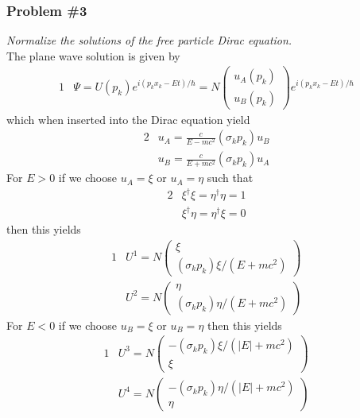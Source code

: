 \documentclass[]{article}
\numberwithin{equation}{subsection}
\begin{document}
\subsubsection*{Problem \#3}
\emph{Normalize the solutions of the free particle Dirac equation.}\\

\noindent The plane wave solution is given by
\begin{alignat}{1}
  \label{i31} &\Psi=U(p_{k})e^{i(p_{k}x_{k}-Et)/\hbar}=N
  \begin{pmatrix}
    u_{A}(p_{k})\\
    u_{B}(p_{k})
  \end{pmatrix}e^{i(p_{k}x_{k}-Et)/\hbar}
\end{alignat}
which when inserted into the Dirac equation yield
\begin{alignat}{2}
  \label{i32} &u_{A}=\frac{c}{E-mc^{2}}(\sigma_{k}p_{k})u_{B}\\
  \label{i33} &u_{B}=\frac{c}{E+mc^{2}}(\sigma_{k}p_{k})u_{A}
\end{alignat}
For $E>0$ if we choose $u_{A}=\xi$ or $u_{A}=\eta$ such that
\begin{alignat}{2}
  \label{i34} &\xi^{\dagger}\xi=\eta^{\dagger}\eta=1\\
  \label{i35} &\xi^{\dagger}\eta=\eta^{\dagger}\xi=0
\end{alignat}
then this yields
\begin{alignat}{1}
  \label{i36} &U^{1}=N
  \begin{pmatrix}
    \xi\\(\sigma_{k}p_{k})\xi/(E+mc^{2})
  \end{pmatrix}\\
  \label{i37} &U^{2}=N
  \begin{pmatrix}
    \eta\\(\sigma_{k}p_{k})\eta/(E+mc^{2})
  \end{pmatrix}
\end{alignat}
For $E<0$ if we choose $u_{B}=\xi$ or $u_{B}=\eta$ then this yields
\begin{alignat}{1}
  \label{i38} &U^{3}=N
  \begin{pmatrix}
    -(\sigma_{k}p_{k})\xi/(|E|+mc^{2})\\ \xi
  \end{pmatrix}\\
  \label{i39} &U^{4}=N
  \begin{pmatrix}
    -(\sigma_{k}p_{k})\eta/(|E|+mc^{2})\\ \eta
  \end{pmatrix}
\end{alignat}
\end{document}
